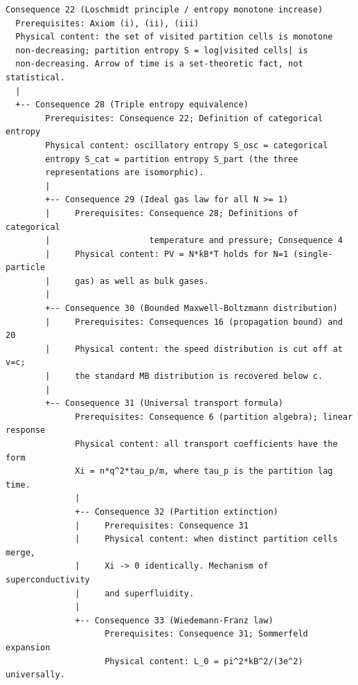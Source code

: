 \begin{center}
\begin{verbatim}
Consequence 22 (Loschmidt principle / entropy monotone increase)
  Prerequisites: Axiom (i), (ii), (iii)
  Physical content: the set of visited partition cells is monotone
  non-decreasing; partition entropy S = log|visited cells| is
  non-decreasing. Arrow of time is a set-theoretic fact, not statistical.
  |
  +-- Consequence 28 (Triple entropy equivalence)
        Prerequisites: Consequence 22; Definition of categorical entropy
        Physical content: oscillatory entropy S_osc = categorical
        entropy S_cat = partition entropy S_part (the three
        representations are isomorphic).
        |
        +-- Consequence 29 (Ideal gas law for all N >= 1)
        |     Prerequisites: Consequence 28; Definitions of categorical
        |                    temperature and pressure; Consequence 4
        |     Physical content: PV = N*kB*T holds for N=1 (single-particle
        |     gas) as well as bulk gases.
        |
        +-- Consequence 30 (Bounded Maxwell-Boltzmann distribution)
        |     Prerequisites: Consequences 16 (propagation bound) and 20
        |     Physical content: the speed distribution is cut off at v=c;
        |     the standard MB distribution is recovered below c.
        |
        +-- Consequence 31 (Universal transport formula)
              Prerequisites: Consequence 6 (partition algebra); linear response
              Physical content: all transport coefficients have the form
              Xi = n*q^2*tau_p/m, where tau_p is the partition lag time.
              |
              +-- Consequence 32 (Partition extinction)
              |     Prerequisites: Consequence 31
              |     Physical content: when distinct partition cells merge,
              |     Xi -> 0 identically. Mechanism of superconductivity
              |     and superfluidity.
              |
              +-- Consequence 33 (Wiedemann-Franz law)
                    Prerequisites: Consequence 31; Sommerfeld expansion
                    Physical content: L_0 = pi^2*kB^2/(3e^2) universally.


\end{verbatim}
\end{center}
